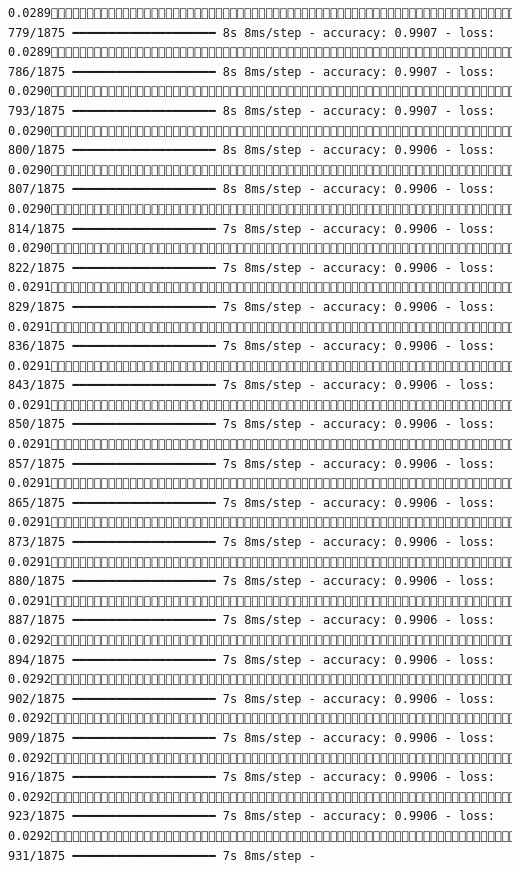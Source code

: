 \documentclass[
  letterpaper,
  DIV=11,
  numbers=noendperiod]{scrreprt}
\begin{document}
\begin{verbatim}
0.0289 779/1875 ━━━━━━━━━━━━━━━━━━━━ 8s 8ms/step - accuracy: 0.9907 - loss: 0.0289 786/1875 ━━━━━━━━━━━━━━━━━━━━ 8s 8ms/step - accuracy: 0.9907 - loss: 0.0290 793/1875 ━━━━━━━━━━━━━━━━━━━━ 8s 8ms/step - accuracy: 0.9907 - loss: 0.0290 800/1875 ━━━━━━━━━━━━━━━━━━━━ 8s 8ms/step - accuracy: 0.9906 - loss: 0.0290 807/1875 ━━━━━━━━━━━━━━━━━━━━ 8s 8ms/step - accuracy: 0.9906 - loss: 0.0290 814/1875 ━━━━━━━━━━━━━━━━━━━━ 7s 8ms/step - accuracy: 0.9906 - loss: 0.0290 822/1875 ━━━━━━━━━━━━━━━━━━━━ 7s 8ms/step - accuracy: 0.9906 - loss: 0.0291 829/1875 ━━━━━━━━━━━━━━━━━━━━ 7s 8ms/step - accuracy: 0.9906 - loss: 0.0291 836/1875 ━━━━━━━━━━━━━━━━━━━━ 7s 8ms/step - accuracy: 0.9906 - loss: 0.0291 843/1875 ━━━━━━━━━━━━━━━━━━━━ 7s 8ms/step - accuracy: 0.9906 - loss: 0.0291 850/1875 ━━━━━━━━━━━━━━━━━━━━ 7s 8ms/step - accuracy: 0.9906 - loss: 0.0291 857/1875 ━━━━━━━━━━━━━━━━━━━━ 7s 8ms/step - accuracy: 0.9906 - loss: 0.0291 865/1875 ━━━━━━━━━━━━━━━━━━━━ 7s 8ms/step - accuracy: 0.9906 - loss: 0.0291 873/1875 ━━━━━━━━━━━━━━━━━━━━ 7s 8ms/step - accuracy: 0.9906 - loss: 0.0291 880/1875 ━━━━━━━━━━━━━━━━━━━━ 7s 8ms/step - accuracy: 0.9906 - loss: 0.0291 887/1875 ━━━━━━━━━━━━━━━━━━━━ 7s 8ms/step - accuracy: 0.9906 - loss: 0.0292 894/1875 ━━━━━━━━━━━━━━━━━━━━ 7s 8ms/step - accuracy: 0.9906 - loss: 0.0292 902/1875 ━━━━━━━━━━━━━━━━━━━━ 7s 8ms/step - accuracy: 0.9906 - loss: 0.0292 909/1875 ━━━━━━━━━━━━━━━━━━━━ 7s 8ms/step - accuracy: 0.9906 - loss: 0.0292 916/1875 ━━━━━━━━━━━━━━━━━━━━ 7s 8ms/step - accuracy: 0.9906 - loss: 0.0292 923/1875 ━━━━━━━━━━━━━━━━━━━━ 7s 8ms/step - accuracy: 0.9906 - loss: 0.0292 931/1875 ━━━━━━━━━━━━━━━━━━━━ 7s 8ms/step - 
\end{verbatim}
\end{document}

